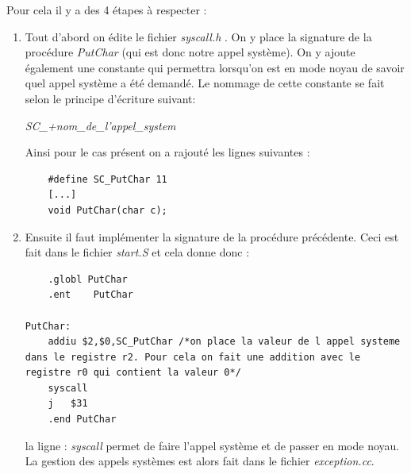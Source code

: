 \documentclass[a4paper,10pt]{article}
\begin{document}
  Pour cela il y a des 4 étapes à respecter :
  \begin{enumerate}
   \item Tout d'abord on édite le fichier \emph{syscall.h} . On y place la signature de la procédure \emph{PutChar} (qui est donc notre appel système). 
   On y ajoute également une constante qui permettra lorsqu'on est en mode noyau de savoir quel appel système a été demandé. Le nommage de cette constante 
   se fait selon le principe d'écriture suivant:
   \begin{center}
    \emph{SC\_+nom\_de\_l'appel\_system}
   \end{center}
  Ainsi pour le cas présent on a rajouté les lignes suivantes : 
  \begin{lstlisting}
    #define SC_PutChar 11
    [...]
    void PutChar(char c);
  \end{lstlisting}
  \item Ensuite il faut implémenter la signature de la procédure précédente. Ceci est fait dans le fichier \emph{start.S} et cela donne donc :
  \begin{lstlisting}
	.globl PutChar
	.ent 	PutChar

PutChar:
	addiu $2,$0,SC_PutChar /*on place la valeur de l appel systeme dans le registre r2. Pour cela on fait une addition avec le registre r0 qui contient la valeur 0*/
	syscall
	j	$31
	.end PutChar   
  \end{lstlisting}
la ligne : \emph{syscall} permet de faire l'appel système et de passer en mode noyau. La gestion des appels systèmes est alors fait dans le fichier 
\emph{exception.cc}. 


\end{enumerate}
\end{document}
